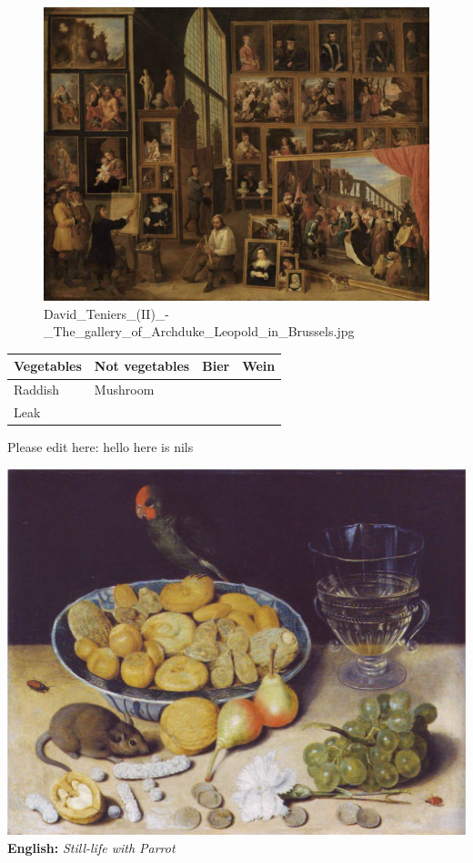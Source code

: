 \documentclass[
  letterpaper,
]{book}
\begin{document}
\begin{figure}

{\centering \includegraphics{./6780765/Brussels.jpg}

}

\caption{David\_Teniers\_(II)\_-\_The\_gallery\_of\_Archduke\_Leopold\_in\_Brussels.jpg}

\end{figure}

\begin{longtable}[]{@{}llll@{}}
\toprule()
Vegetables & Not vegetables & Bier & Wein \\
\midrule()
\endhead
Raddish & Mushroom & & \\
Leak & & & \\
\bottomrule()
\end{longtable}

Please edit here: hello here is nils

\includegraphics{./6780765/Papagei.jpg}\\
\textbf{English:} \emph{Still-life with Parrot}
\end{document}
